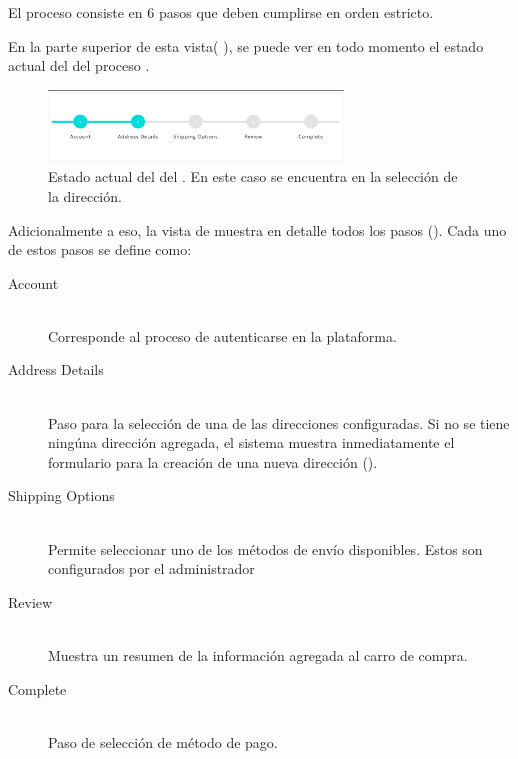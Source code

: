\section{\shippingEF}\label{chapter:solucionimplementada:section:shipping}

	El proceso consiste en 6 pasos que deben cumplirse en orden estricto.

	En la parte superior de esta vista( ), se puede ver en todo momento el estado actual del \workflowCPT del proceso \shippingEF.

	\begin{figure}[H]
		\centering
		\includegraphics[width=0.7\textwidth]{figuras/shipping/global_status.png}
		\caption{Estado actual del \workflowCPT del \shippingEF. En este caso se encuentra en la selección de la dirección.}
		\label{figure:shipping:global_status}
	\end{figure}

	Adicionalmente a eso, la vista de \shippingEF muestra en detalle todos los pasos (). Cada uno de estos pasos se define como:

	\begin{description}
		\item[Account] \hfill \\
			Corresponde al proceso de autenticarse en la plataforma.
		\item[Address Details] \hfill \\
			Paso para la selección de una de las direcciones configuradas. Si no se tiene ningúna dirección agregada, el sistema muestra inmediatamente el formulario para la creación de una nueva dirección ().
		\item[Shipping Options] \hfill \\
			Permite seleccionar uno de los métodos de envío disponibles. Estos son configurados por el administrador 
		\item[Review] \hfill \\
			Muestra un resumen de la información agregada al carro de compra. 
		\item[Complete] \hfill \\
			Paso de selección de método de pago.
	\end{description}



